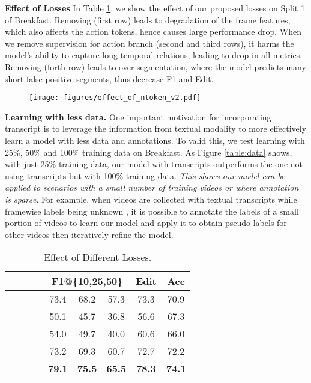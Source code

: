 \documentclass[10pt,twocolumn,letterpaper]{article}
\newcommand{\headline}[1]{\noindent \textbf{#1}}
\newcommand{\0}{\boldsymbol{0}}
\begin{document}
\headline{Effect of Losses}
In Table \ref{table:losses}, we show the effect of our proposed losses on Split 1 of Breakfast. 
Removing  (first row) leads to degradation of the frame features, which also affects the action tokens, hence causes large performance drop.  
When we remove supervision for action branch (second and third rows), it harms the model's ability to capture long temporal relations, leading to drop in all metrics.
Removing  (forth row) leads to over-segmentation, where the model predicts many short false positive segments, thus decrease F1 and Edit.



\begin{figure}
   \centering
   \texttt{[image: figures/effect\_of\_ntoken\_v2.pdf]}
   \label{fig:action-token}
\end{figure}

\headline{Learning with less data.}
One important motivation for incorporating transcript is to leverage the information from textual modality to more effectively learn a model with less data and annotations. To valid this, we test learning with 25\%, 50\% and 100\% training data on Breakfast. As Figure \ref{table:data} shows, with just 25\% training data, our model with transcripts outperforms the one not using transcripts but with 100\% training data. \emph{This shows our model can be applied to scenarios with a small number of training videos or where annotation is sparse}. 
For example, when videos are collected with textual transcripts while framewise labels being unknown \cite{Richard-Viterbi:CVPR18,Ding:CVPR18,Chang:CVPR19,Li:ICCV19,Lu:ICCV21,Souri:PAMI21}, it is possible to annotate the labels of a small portion of videos to learn our model and apply it to obtain pseudo-labels for other videos then iteratively refine the model.


\begin{table}
   \centering
    \small
   \begin{tabular}{|cccc|ccc|c|c|}
   \hline
    &  &  &  & \multicolumn{3}{c|}{F1@\{10,25,50\}} & Edit & Acc \\ \hline
 &  &  &  & 73.4 & 68.2 & 57.3 & 73.3 & 70.9\\ \hline  & &  &  & 50.1 & 45.7 & 36.8 & 56.6 & 67.3 \\ &  &  &  & 54.0 & 49.7 & 40.0 & 60.6 & 66.0 \\ &  &  &  & 73.2& 69.3& 60.7& 72.7& 72.2  \\ \hline  &  &  &  & \textbf{79.1} & \textbf{75.5}& \textbf{65.5} & \textbf{78.3} & \textbf{74.1} \\ \hline
   \end{tabular}
   \vspace{1mm}
   \caption{\small Effect of Different Losses.}
   \label{table:losses}
\end{table}
\end{document}

